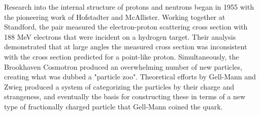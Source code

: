 Research into the internal structure of protons and neutrons began in 1955 with the pioneering work of Hofstadter and McAllister.  Working together at Standford, the pair measured the electron-proton scattering cross section with 188 MeV electrons that were incident on a hydrogen target. Their analysis demonstrated that at large angles the measured cross section was inconsistent with the cross section predicted for a point-like proton.  Simultaneously, the Brookhaven Cosmotron produced an overwhelming number of new particles, creating what was dubbed a "particle zoo".  Theoretical efforts by Gell-Mann and Zwieg produced a system of categorizing the particles by their charge and strangeness, and eventually the basis for constructing these in terms of a new type of fractionally charged particle that Gell-Mann coined the quark.  


%


